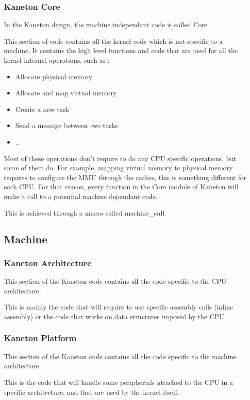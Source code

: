 \begin{frame}
  \frametitle{Kaneton Core}

  In the Kaneton design, the machine independant code is called Core.

  \-

  This section of code contains all the kernel code which is not specific to a machine. It contains the high level functions and code that are used for all the kernel internal operations, such as :
  \begin{itemize}
  \item Allocate physical memory
  \item Allocate and map virtual memory
  \item Create a new task
  \item Send a message between two tasks
  \item \ldots
  \end{itemize}

  Most of these operations don't require to do any CPU specific operations, but some of them do. For example, mapping virtual memory to physical memory requires to configure the MMU through the caches, this is something different for each CPU. For that reason, every function in the Core module of Kaneton will make a call to a potential machine dependant code.

  \-
  
  This is achieved through a macro called machine\_call.

\end{frame}

\subsection{Machine}

\begin{frame}
  \frametitle{Kaneton Architecture}
  
  This section of the Kaneton code contains all the code specific to the CPU architecture.

  \-

  This is mainly the code that will require to use specific assembly calls (inline assembly) or the code that works on data structures imposed by the CPU.

\end{frame}

\begin{frame}
  \frametitle{Kaneton Platform}
  
  This section of the Kaneton code contains all the code specific to the machine architecture.

  \-

  This is the code that will handle some peripherials attached to the CPU in a specific architecture, and that are used by the kernel itself.

\end{frame}

